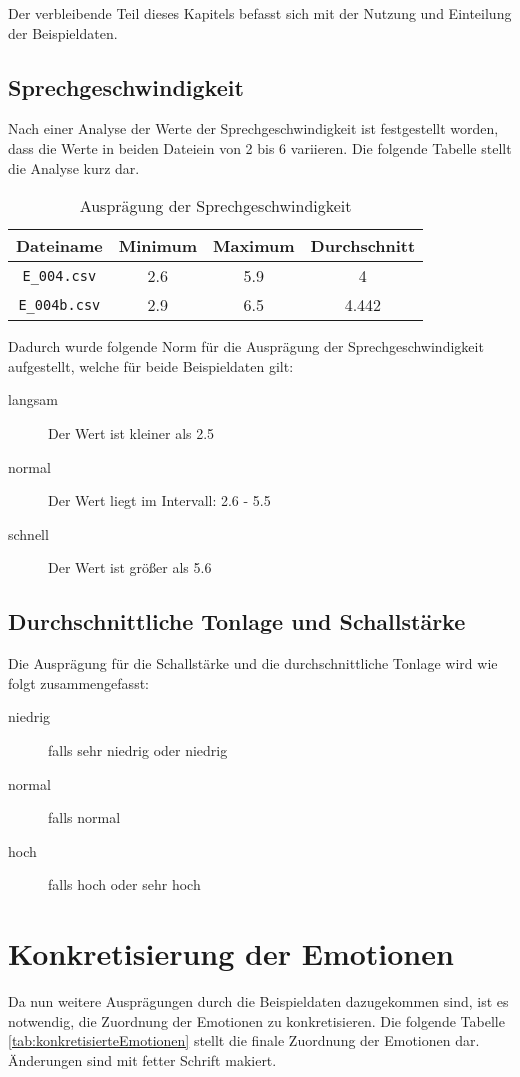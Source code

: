 Der verbleibende Teil dieses Kapitels befasst sich mit der Nutzung und Einteilung der Beispieldaten.

\subsection{Sprechgeschwindigkeit}
Nach einer Analyse der Werte der Sprechgeschwindigkeit ist festgestellt worden, dass die Werte in beiden Dateiein von 2 bis 6 variieren. Die folgende Tabelle stellt die Analyse kurz dar. 

\begin{table}[h]
\begin{tabular}{ c | c | c | c}
  Dateiname & Minimum & Maximum & Durchschnitt \\
  \hline 
  \verb|E_004.csv|  & 2.6 & 5.9 & 4 \\
  \verb|E_004b.csv| & 2.9 & 6.5 & 4.442 \\
\end{tabular}
\caption{Ausprägung der Sprechgeschwindigkeit}
\label{tab:sprechgeschwdingikeit}
\end{table}

Dadurch wurde folgende Norm für die Ausprägung der Sprechgeschwindigkeit aufgestellt, welche für beide Beispieldaten gilt:
\begin{description}
  \item [langsam] Der Wert ist kleiner als 2.5
  \item [normal] Der Wert liegt im Intervall: 2.6 - 5.5
  \item [schnell] Der Wert ist größer als 5.6
\end{description}

\subsection{Durchschnittliche Tonlage und Schallstärke}
Die Ausprägung für die Schallstärke und die durchschnittliche Tonlage wird wie folgt zusammengefasst:
\begin{description}
\item [niedrig] falls sehr niedrig oder niedrig
\item [normal] falls normal
\item [hoch] falls hoch oder sehr hoch
\end{description}

\section{Konkretisierung der Emotionen}
Da nun weitere Ausprägungen durch die Beispieldaten dazugekommen sind, ist es notwendig, die Zuordnung der Emotionen zu konkretisieren. Die folgende Tabelle \ref{tab:konkretisierteEmotionen} stellt die finale Zuordnung der Emotionen dar. Änderungen sind mit fetter Schrift makiert.


